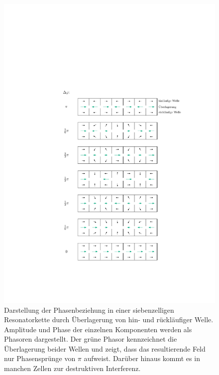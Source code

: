 \begin{figure}[p]
	\centering
	\hspace{2cm} %
	\includegraphics[scale=1.0]{./figs/zellen_phasoren.pdf}
	\caption[Phasenbeziehung in einer siebenzelligen Resonatorkette]{Darstellung der Phasenbeziehung in einer siebenzelligen Resonatorkette durch Überlagerung von hin- und rückläufiger Welle. Amplitude und Phase der einzelnen Komponenten werden als Phasoren dargestellt. Der grüne Phasor kennzeichnet die Überlagerung beider Wellen und zeigt, dass das resultierende Feld nur Phasensprünge von $\pi$ aufweist. Darüber hinaus kommt es in manchen Zellen zur destruktiven Interferenz.}
	\label{fig:phasenbeziehung}
\end{figure}

